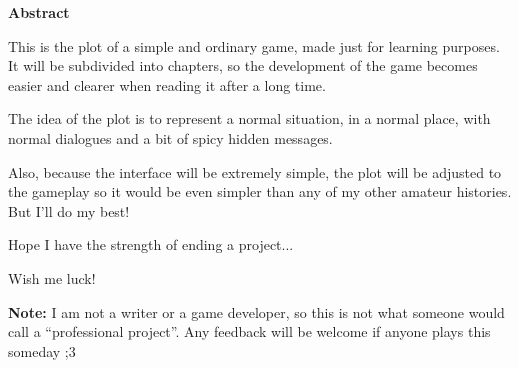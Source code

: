 \newpage

\begin{center}
    {\Huge \textbf{Abstract}}
\end{center}
This is the plot of a simple and ordinary game, made just for learning purposes. It will be subdivided into chapters, so the development of the game becomes easier and clearer when reading it after a long time. \par

The idea of the plot is to represent a normal situation, in a normal place, with normal dialogues and a bit of spicy hidden messages. \par

Also, because the interface will be extremely simple, the plot will be adjusted to the gameplay so it would be even simpler than any of my other amateur histories. But I'll do my best! \par

Hope I have the strength of ending a project... \par
Wish me luck!

\vfill
\textbf{Note:} I am not a writer or a game developer, so this is not what someone would call a ``professional project''. Any feedback will be welcome if anyone plays this someday ;3

